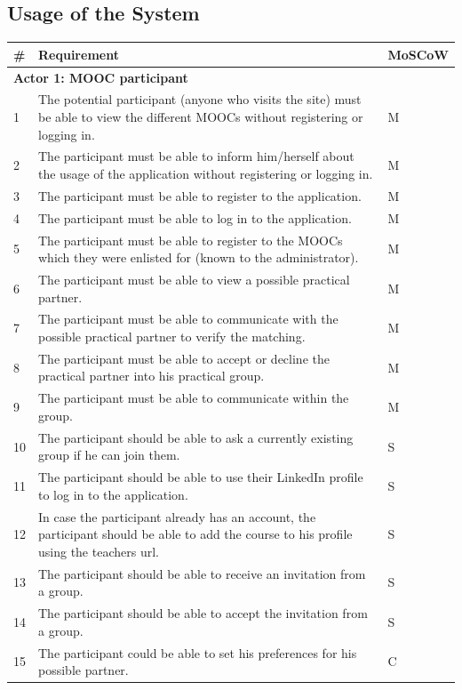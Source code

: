 \subsection{Usage of the System}
\begin{tabular}{ | p{0.5cm} | p{12cm} | p{2cm} | }
 \hline
 \textbf{\#} & \textbf{Requirement} & \textbf{MoSCoW} \\ \hline
 \multicolumn{3}{|p{14.5cm}|}{\textbf{Actor 1: MOOC participant}} \\ \hline
1 & The potential participant (anyone who visits the site) must be able to view the different MOOCs without registering or logging in. & M \\ \hline
2 & The participant must be able to inform him/herself about the usage of the application without registering or logging in. & M \\ \hline
3 & The participant must be able to register to the application. & M \\ \hline
4 & The participant must be able to log in to the application. & M \\ \hline
5 & The participant must be able to register to the MOOCs which they were enlisted for (known to the administrator). & M \\ \hline
6 & The participant must be able to view a possible practical partner. & M \\ \hline
7 & The participant must be able to communicate with the possible practical partner to verify the matching. & M \\ \hline
8 & The participant must be able to accept or decline the practical partner into his practical group. & M \\ \hline
9 & The participant must be able to communicate within the group. & M \\ \hline
10 & The participant should be able to ask a currently existing group if he can join them. & S \\ \hline
11 & The participant should be able to use their LinkedIn profile to log in to the application. & S \\ \hline
12 & In case the participant already has an account, the participant should be able to add the course to his profile using the teachers url. & S \\ \hline
13 & The participant should be able to receive an invitation from a group. & S \\ \hline
14 & The participant should be able to accept the invitation from a group. & S \\ \hline
15 & The participant could be able to set his preferences for his possible partner. & C \\ \hline

\end{tabular}
